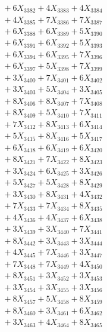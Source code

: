 \documentclass[a4paper,10pt]{article}
\begin{document}
{\begin{align}
&\;  + 6 X_{3382} + 4 X_{3383} + 4 X_{3384} \\[0.3ex]
&\;  + 4 X_{3385} + 7 X_{3386} + 7 X_{3387} \\[0.3ex]
&\;  + 6 X_{3388} + 6 X_{3389} + 5 X_{3390} \\[0.3ex]
&\;  + 6 X_{3391} + 6 X_{3392} + 5 X_{3393} \\[0.3ex]
&\;  + 6 X_{3394} + 6 X_{3395} + 7 X_{3396} \\[0.3ex]
&\;  + 6 X_{3397} + 5 X_{3398} + 7 X_{3399} \\[0.5ex]\allowbreak
&\;  + 3 X_{3400} + 7 X_{3401} + 6 X_{3402} \\[0.3ex]
&\;  + 3 X_{3403} + 5 X_{3404} + 3 X_{3405} \\[0.3ex]
&\;  + 8 X_{3406} + 8 X_{3407} + 7 X_{3408} \\[0.3ex]
&\;  + 8 X_{3409} + 5 X_{3410} + 7 X_{3411} \\[0.3ex]
&\;  + 7 X_{3412} + 8 X_{3413} + 6 X_{3414} \\[0.3ex]
&\;  + 5 X_{3415} + 8 X_{3416} + 5 X_{3417} \\[0.3ex]
&\;  + 6 X_{3418} + 6 X_{3419} + 6 X_{3420} \\[0.3ex]
&\;  + 8 X_{3421} + 7 X_{3422} + 8 X_{3423} \\[0.3ex]
&\;  + 3 X_{3424} + 6 X_{3425} + 3 X_{3426} \\[0.3ex]
&\;  + 5 X_{3427} + 5 X_{3428} + 8 X_{3429} \\[0.5ex]\allowbreak
&\;  + 3 X_{3430} + 8 X_{3431} + 4 X_{3432} \\[0.3ex]
&\;  + 7 X_{3433} + 7 X_{3434} + 8 X_{3435} \\[0.3ex]
&\;  + 4 X_{3436} + 4 X_{3437} + 6 X_{3438} \\[0.3ex]
&\;  + 3 X_{3439} + 3 X_{3440} + 7 X_{3441} \\[0.3ex]
&\;  + 8 X_{3442} + 3 X_{3443} + 3 X_{3444} \\[0.3ex]
&\;  + 4 X_{3445} + 7 X_{3446} + 3 X_{3447} \\[0.3ex]
&\;  + 7 X_{3448} + 7 X_{3449} + 4 X_{3450} \\[0.3ex]
&\;  + 8 X_{3451} + 3 X_{3452} + 3 X_{3453} \\[0.3ex]
&\;  + 3 X_{3454} + 3 X_{3455} + 3 X_{3456} \\[0.3ex]
&\;  + 8 X_{3457} + 5 X_{3458} + 8 X_{3459} \\[0.5ex]\allowbreak
&\;  + 8 X_{3460} + 3 X_{3461} + 6 X_{3462} \\[0.3ex]
&\;  + 3 X_{3463} + 4 X_{3464} + 8 X_{3465} \\[0.3ex]

\end{align}}
\end{document}
